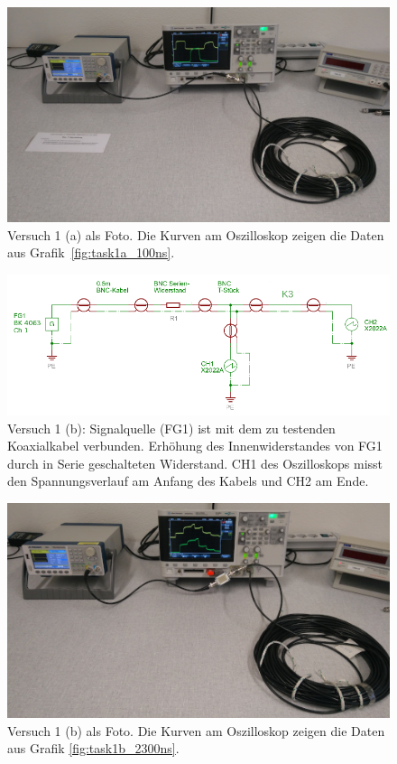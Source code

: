 \documentclass{article}
\begin{document}
\begin{figure}[H]
\centering
\caption{Versuch 1 (a) als Foto. Die Kurven am Oszilloskop zeigen die Daten aus Grafik~\ref{fig:task1a_100ns}.}
\label{fig:foto_task1a}
\includegraphics[scale=0.6]{foto_task1a.jpg}
\end{figure}



\begin{figure}[H]
\centering
\caption{Versuch 1 (b): Signalquelle (FG1) ist mit dem zu testenden Koaxialkabel verbunden. Erhöhung des Innenwiderstandes von FG1 durch in Serie geschalteten Widerstand. CH1 des Oszilloskops misst den Spannungsverlauf am Anfang des Kabels und CH2 am Ende.}
\label{fig:anordnung_task1b}
\includegraphics[scale=2]{task1b.png}
\end{figure}



\begin{figure}[H]
\centering
\caption{Versuch 1 (b) als Foto. Die Kurven am Oszilloskop zeigen die Daten aus Grafik \ref{fig:task1b_2300ns}.}
\label{fig:foto_task1b}
\includegraphics[scale=0.6]{foto_task1b.jpg}
\end{figure}
\end{document}
